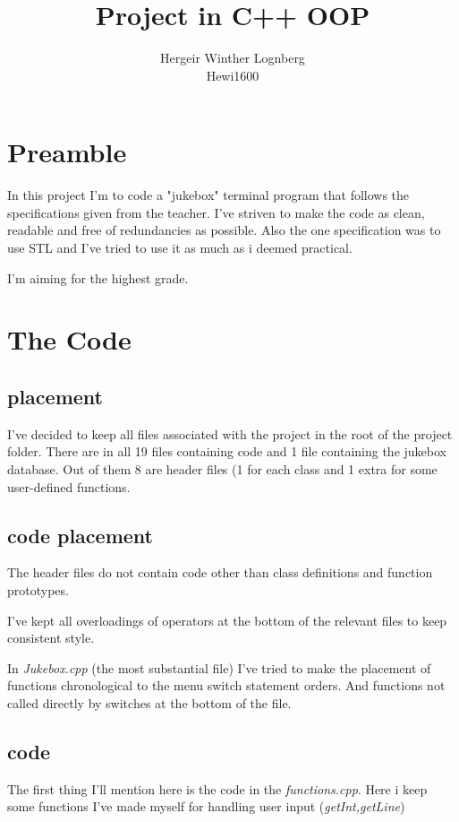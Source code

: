 \documentclass[11pt]{article}
\title{\textbf{Project in C++ OOP}}
\author{Hergeir Winther Lognberg \\
Hewi1600}
\date{}
\begin{document}
\maketitle

\section{Preamble}

In this project I'm to code a "jukebox" terminal program that follows the specifications given from the teacher.
I've striven to make the code as clean, readable and free of redundancies as possible. Also the one specification was to use STL and I've tried to use it as much as i deemed practical. 

I'm aiming for the highest grade.

\section{The Code}

\subsection{placement}
I've decided to keep all files associated with the project in the root of the project folder. There are in all 19 files containing code and 1 file containing the jukebox database. Out of them 8 are header files (1 for each class and 1 extra for some user-defined functions. 

\subsection{code placement}
The header files do not contain code other than class definitions and function prototypes. 

I've kept all overloadings of operators at the bottom of the relevant files to keep consistent style.

In \emph{Jukebox.cpp} (the most substantial file) I've tried to make the placement of functions chronological to the menu switch statement orders. And functions not called directly by switches at the bottom of the file. 

\subsection{code}
The first thing I'll mention here is the code in the \emph{functions.cpp}. Here i keep some functions I've made myself for handling user input (\emph{getInt,getLine})
\end{document}
